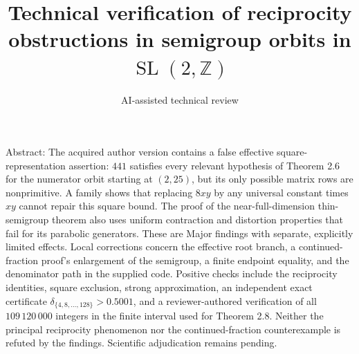 \documentclass[10pt]{article}
\title{Technical verification of reciprocity obstructions
in semigroup orbits in \(\operatorname{SL}(2,\mathbb Z)\)}
\author{AI-assisted technical review}
\date{}
\begin{document}
\maketitle
Abstract: The acquired author version contains a false effective square-representation assertion: \(441\) satisfies every relevant hypothesis of Theorem 2.6 for the numerator orbit starting at \((2,25)\), but its only possible matrix rows are nonprimitive. A family shows that replacing \(8xy\) by any universal constant times \(xy\) cannot repair this square bound. The proof of the near-full-dimension thin-semigroup theorem also uses uniform contraction and distortion properties that fail for its parabolic generators. These are Major findings with separate, explicitly limited effects. Local corrections concern the effective root branch, a continued-fraction proof’s enlargement of the semigroup, a finite endpoint equality, and the denominator path in the supplied code. Positive checks include the reciprocity identities, square exclusion, strong approximation, an independent exact certificate \(\delta_{\{4,8,\ldots,128\}}>0.5001\), and a reviewer-authored verification of all \(109\,120\,000\) integers in the finite interval used for Theorem 2.8. Neither the principal reciprocity phenomenon nor the continued-fraction counterexample is refuted by the findings. Scientific adjudication remains pending.\par
\end{document}
